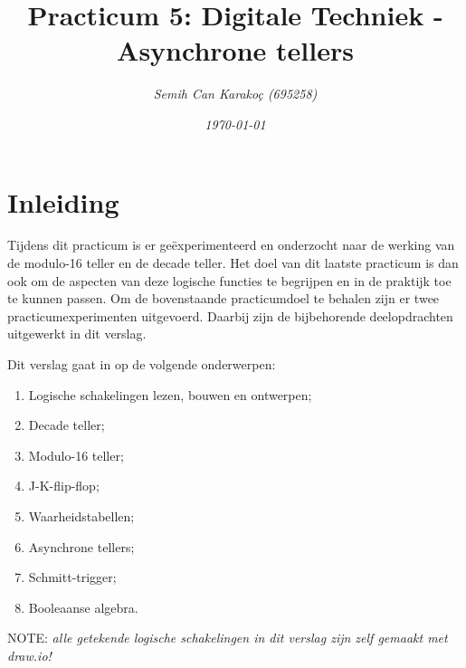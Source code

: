\documentclass[12pt]{article}
\title{\textbf{Practicum 5: Digitale Techniek - Asynchrone tellers}}
\author{\textit{Semih Can Karakoç (695258)}}
\date{\textit{\today}}
\begin{document}
\clearpage\maketitle    %
\thispagestyle{empty}  %
\begin{figure}[h]
    \centering
\end{figure}
\pagebreak

\tableofcontents    %
\pagebreak

\section{Inleiding}
Tijdens dit practicum is er geëxperimenteerd en onderzocht naar de werking van de modulo-16 teller en de decade teller.
Het doel van dit laatste practicum is dan ook om de aspecten van deze logische functies te begrijpen en in de praktijk toe te kunnen passen.
Om de bovenstaande practicumdoel te behalen zijn er twee practicumexperimenten uitgevoerd. 
Daarbij zijn de bijbehorende deelopdrachten uitgewerkt in dit verslag. 

Dit verslag gaat in op de volgende onderwerpen: 
\begin{enumerate}
    \item Logische schakelingen lezen, bouwen en ontwerpen;
    \item Decade teller;
    \item Modulo-16 teller;
    \item J-K-flip-flop;
    \item Waarheidstabellen;
    \item Asynchrone tellers;
    \item Schmitt-trigger;
    \item Booleaanse algebra.
\end{enumerate}
\vspace{8cm}
NOTE: \textit{alle getekende logische schakelingen in dit verslag zijn zelf gemaakt met draw.io!}
\pagebreak
\end{document}
